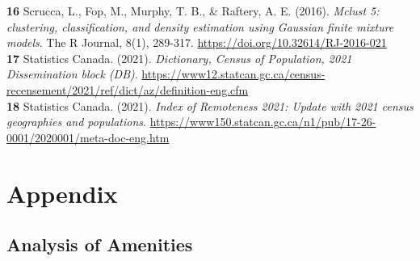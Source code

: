 \documentclass[11pt, a4paper]{article}
\newcommand{\comment}[1]{}
\begin{document}
\noindent\textbf{16} Scrucca, L., Fop, M., Murphy, T. B., \& Raftery, A. E. (2016). \textit{Mclust 5: clustering, classification, and density estimation using Gaussian finite mixture models}. The R Journal, 8(1), 289-317.  \sloppy\url{https://doi.org/10.32614/RJ-2016-021} \\

\noindent\textbf{17} Statistics Canada. (2021). \textit{Dictionary, Census of Population, 2021
Dissemination block (DB)}. \sloppy\url{https://www12.statcan.gc.ca/census-recensement/2021/ref/dict/az/definition-eng.cfm} \\

\noindent\textbf{18} Statistics Canada. (2021). \textit{Index of Remoteness 2021: Update with 2021 census geographies and populations}. \sloppy\url{https://www150.statcan.gc.ca/n1/pub/17-26-0001/2020001/meta-doc-eng.htm} \\













\comment{

\renewcommand{\bibsection}{}

}







\pagebreak
\appendix
\section{Appendix}


\subsection{Analysis of Amenities}\label{appendix:analysis}
\end{document}
